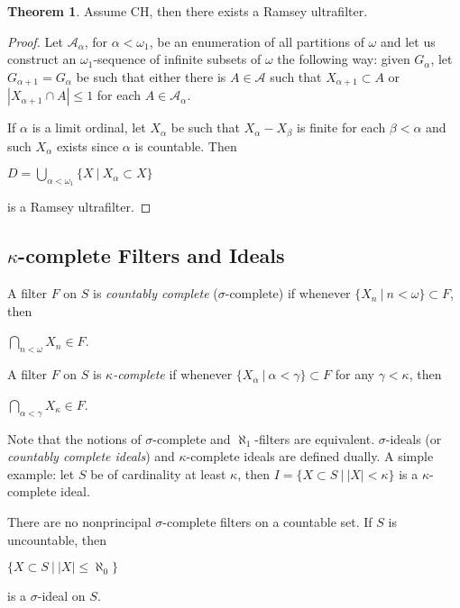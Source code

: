 \documentclass[8pt]{article}
\theoremstyle{definition}
\theoremstyle{definition}
\newtheorem{theorem}{Theorem}[section]
\theoremstyle{definition}
\theoremstyle{definition}
\theoremstyle{definition}
\theoremstyle{definition}
\theoremstyle{definition}
\theoremstyle{definition}
\theoremstyle{definition}
\theoremstyle{definition}
\theoremstyle{definition}
\theoremstyle{definition}
\theoremstyle{definition}
\theoremstyle{definition}
\theoremstyle{question}
\begin{document}
\begin{theorem}
  Assume CH, then there exists a Ramsey ultrafilter.
\end{theorem}

\begin{proof}
  Let $\mathcal{A}_{\alpha}$, for $\alpha < \omega_1$, be an enumeration of all partitions of $\omega$ and let us
  construct an $\omega_1$-sequence of infinite subsets of $\omega$ the following way: 
  given $G_{\alpha}$, let $G_{\alpha + 1} = G_{\alpha}$ be such that either there is $A \in \mathcal{A}$ such that
  $X_{\alpha + 1} \subset A$ or $|X_{\alpha + 1} \cap A| \leq 1$ for each $A \in \mathcal{A}_{\alpha}$.

  If $\alpha$ is a limit ordinal, let $X_{\alpha}$ be such that $X_{\alpha} - X_{\beta}$ is finite for each $\beta < \alpha$
  and such $X_{\alpha}$ exists since $\alpha$ is countable.
  Then
  \begin{center}
    $D = \bigcup \limits_{\alpha < \omega_1} \{ X \: | \: X_{\alpha} \subset X \}$
  \end{center}
  is a Ramsey ultrafilter.
\end{proof}

\subsection{$\kappa$-complete Filters and Ideals}

A filter $F$ on $S$ is \emph{countably complete} ($\sigma$-complete) if whenever $\{ X_n \: | \: n < \omega \} \subset F$, then
\begin{center}
  $\bigcap \limits_{n < \omega} X_n \in F$.
\end{center}

A filter $F$ on $S$ is \emph{$\kappa$-complete} if whenever $\{ X_{\alpha} \: | \: \alpha < \gamma \} \subset F$ for any $\gamma < \kappa$, then
\begin{center}
  $\bigcap \limits_{\alpha < \gamma} X_{\kappa} \in F$.
\end{center}

Note that the notions of $\sigma$-complete and $\aleph_1$-filters are equivalent. $\sigma$-ideals (or \emph{countably complete ideals}) and $\kappa$-complete ideals are defined dually.
A simple example: let $S$ be of cardinality at least $\kappa$, then $I = \{ X \subset S \: | \: |X| < \kappa \}$ is a $\kappa$-complete ideal.

There are no nonprincipal $\sigma$-complete filters on a countable set. If $S$ is uncountable, then
\begin{center}
$\{ X \subset S \: | \: |X| \leq \aleph_0 \}$
\end{center}
is a $\sigma$-ideal on $S$.
\end{document}

